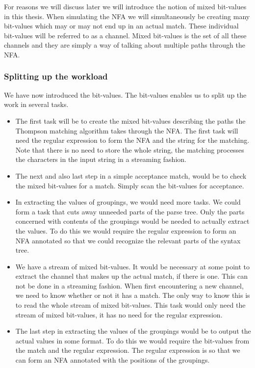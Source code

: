 For reasons we will discuss later we will introduce the notion of
mixed bit-values in this thesis. When simulating the NFA we will
simultaneously be creating many bit-values which may or may not end up
in an actual match. These individual bit-values will be referred to as
a channel. Mixed bit-values is the set of all these channels and they
are simply a way of talking about multiple paths through the NFA.

\subsubsection{Splitting up the workload}
We have now introduced the bit-values. The bit-values enables us to
split up the work in several tasks. 
\begin{itemize}
\item The first task will be to create the mixed bit-values describing
  the paths the Thompson matching algorithm takes through the NFA. The
  first task will need the regular expression to form the NFA and the
  string for the matching. Note that there is no need to store the
  whole string, the matching processes the characters in the input
  string in a streaming fashion.
\item The next and also last step in a simple acceptance match, would
  be to check the mixed bit-values for a match. Simply scan the
  bit-values for acceptance. 
\item In extracting the values of groupings, we would need more
  tasks. We could form a task that cuts away unneeded parts of the
  parse tree. Only the parts concerned with contents of the groupings
  would be needed to actually extract the values. To do this we would
  require the regular expression to form an NFA annotated so that we
  could recognize the relevant parts of the syntax tree.
\item We have a stream of mixed bit-values. It would be necessary at
  some point to extract the channel that makes up the actual match, if
  there is one. This can not be done in a streaming fashion. When
  first encountering a new channel, we need to know whether or not it
  has a match. The only way to know this is to read the whole stream
  of mixed bit-values. This task would only need the stream of mixed
  bit-values, it has no need for the regular expression.
\item The last step in extracting the values of the groupings would be
  to output the actual values in some format. To do this we would
  require the bit-values from the match and the regular
  expression. The regular expression is so that we can form an NFA
  annotated with the positions of the groupings. 
\end{itemize}


